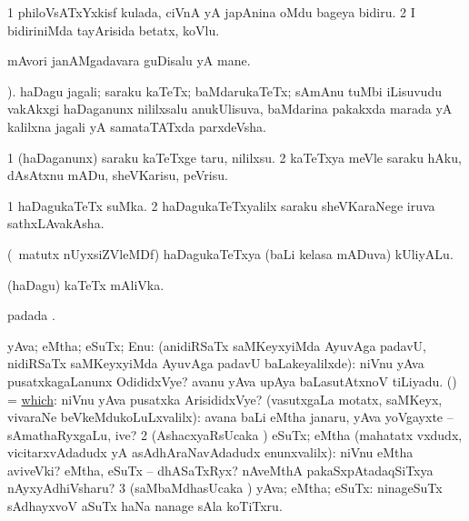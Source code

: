 \bentry
{} 
\gl{\nA}
\expl{}
\bmng
\bnum
\num{1} philoVsATxYxkisf kulada, ciVnA yA japAnina oMdu bageya bidiru. 
\num{2} I bidiriniMda tayArisida betatx, koVlu. 
\enum
\emng
\eentry

\bentry
{} 
\gl{\nA}
\expl{}
\bmng
mAvori janAMgadavara guDisalu yA mane. 
\emng
\eentry

\bentry
{} 
\gl{\nA}
 ).\bmng
haDagu jagali; saraku kaTeTx; baMdarukaTeTx; sAmAnu tuMbi iLisuvudu \mo vakAkxgi haDaganunx nililxsalu anukUlisuva, baMdarina pakakxda marada yA kalilxna jagali yA samataTATxda parxdeVsha. 
\emng
\eentry

\bentry
{} 
\gl{\sakirx}
\expl{}
\bmng
\bnum
\num{1} (haDaganunx) saraku kaTeTxge taru, nililxsu. 
\num{2} kaTeTxya meVle saraku hAku, dAsAtxnu mADu, sheVKarisu, peVrisu. 
\enum
\emng
\eentry

\bentry
{} 
\gl{\nA}
\expl{}
\bmng
\bnum
\num{1} haDagukaTeTx suMka. 
\num{2} haDagukaTeTxyalilx saraku sheVKaraNege iruva sathxLAvakAsha. 
\enum
\emng
\eentry

\bentry
{} 
\gl{\nA}
\expl{}
\bmng
(\AseTxrXV\ matutx nUyxsiZVleMDf) haDagukaTeTxya (baLi kelasa mADuva) kUliyALu. 
\emng
\eentry

\bentry
{} 
\gl{\nA}
\expl{}
\bmng
(haDagu) kaTeTx mAliVka. 
\emng
\eentry

\bentry
{} 
\gl{\nA}
\expl{}
\bmng
{} padada \bava. 
\emng
\eentry

\bentry
{} 
\expl{}
\bmng
\bnum
{} yAva; eMtha; eSuTx; Enu: 
\banum
{} (anidiRSaTx saMKeyxyiMda AyuvAga  padavU, nidiRSaTx saMKeyxyiMda AyuvAga  padavU baLakeyalilxde):  niVnu yAva pusatxkagaLanunx OdididxVye?  avanu yAva upAya baLasutAtxnoV tiLiyadu. 
 (\AmA) = \hyperlink{which(1)}{which}:  niVnu yAva pusatxka ArisididxVye? 
 (vasutxgaLa motatx, saMKeyx, vivaraNe beVkeMdukoLuLxvalilx):  avana baLi eMtha janaru, yAva yoVgayxte -- sAmathaRyxgaLu, ive? 
\eanum
\numie
\num{2} (AshacxyaRsUcaka \gu) eSuTx; eMtha (mahatatx vxdudx, vicitarxvAdadudx yA asAdhAraNavAdadudx enunxvalilx):  niVnu eMtha aviveVki?  eMtha, eSuTx -- dhASaTxRyx?  nAveMthA pakaSxpAtadaqSiTxya nAyxyAdhiVsharu? 
\hypertarget{what(1)3}{} 
\num{3} (saMbaMdhasUcaka \gu) yAva; eMtha; eSuTx:  ninageSuTx sAdhayxvoV aSuTx haNa nanage sAla koTiTxru. 
\enum
\emng


